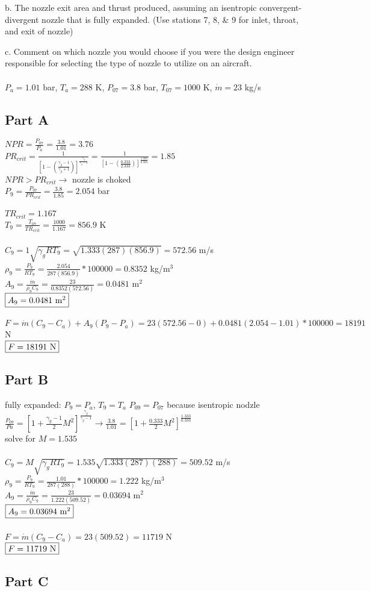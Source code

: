 \documentclass{article}
\begin{document}
b. The nozzle exit area and thrust produced, assuming an isentropic convergent-
divergent nozzle that is fully expanded. (Use stations 7, 8, \& 9 for inlet, throat, and
exit of nozzle)

c. Comment on which nozzle you would choose if you were the design engineer
responsible for selecting the type of nozzle to utilize on an aircraft. \\\\
$P_a=1.01$ bar, $T_a=288$ K, $P_{07}=3.8$ bar, $T_{07}=1000$ K, $\dot{m}=23$ kg/s

\subsection*{Part A}
$NPR=\frac{P_{07}}{P_a}=\frac{3.8}{1.01}=3.76$ \\
$PR_{crit}=\frac{1}{[1-(\frac{\gamma_g-1}{\gamma_g+1})]
^\frac{\gamma_g}{\gamma_g-1}}=\frac{1}{[1-(\frac{0.333}{2.333})]
^\frac{1.333}{0.333}}=1.85$ \\
$NPR>PR_{crit} \rightarrow$ nozzle is choked \\
$P_9=\frac{P_{07}}{PR_{crit}}=\frac{3.8}{1.85}=2.054$ bar \\\\
$TR_{crit}=1.167$ \\
$T_9=\frac{T_{07}}{TR_{crit}}=\frac{1000}{1.167}=856.9$ K \\\\
$C_9=1\sqrt{\gamma_gRT_9}=\sqrt{1.333(287)(856.9)}=572.56$ m/s \\
$\rho_9=\frac{P_9}{RT_9}=\frac{2.054}{287(856.9)}*100000=0.8352$ kg/m$^3$ \\
$A_9=\frac{\dot{m}}{\rho_9C_9}=\frac{23}{0.8352(572.56)}=0.0481$ m$^2$ \\
$\fbox{$A_9=0.0481$ m$^2$}$ \\\\
$F=\dot{m}(C_9-C_a)+A_9(P_9-P_a)=23(572.56-0)+0.0481(2.054-1.01)*100000=18191$ N \\
$\fbox{$F=18191$ N}$

\subsection*{Part B}
fully expanded: $P_9=P_a$, $T_9=T_a$
$P_{09}=P_{07}$ because isentropic nodzle \\
$\frac{P_{09}}{Pa}=[1+\frac{\gamma_g-1}{2}M^2]^\frac{\gamma_g}{\gamma_g-1} \rightarrow
\frac{3.8}{1.01}=[1+\frac{0.333}{2}M^2]^\frac{1.333}{0.333}$ \\
solve for $M=1.535$ \\\\
$C_9=M\sqrt{\gamma_gRT_9}=1.535\sqrt{1.333(287)(288)}=509.52$ m/s \\
$\rho_9=\frac{P_9}{RT_9}=\frac{1.01}{287(288)}*100000=1.222$ kg/m$^3$ \\
$A_9=\frac{\dot{m}}{\rho_9C_9}=\frac{23}{1.222(509.52)}=0.03694$ m$^2$ \\
$\fbox{$A_9=0.03694$ m$^2$}$ \\\\
$F=\dot{m}(C_9-C_a)=23(509.52)=11719$ N \\
$\fbox{$F=11719$ N}$

\subsection*{Part C}
\end{document}
